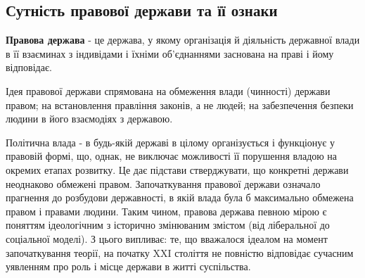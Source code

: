 \subsection{Сутність правової держави та її ознаки}
\textbf{Правова держава} - це держава, у якому організація й діяльність державної влади в її взаєминах з індивідами і їхніми об'єднаннями заснована на праві і йому відповідає.

Ідея правової держави спрямована на обмеження влади (чинності) держави правом; на встановлення правління законів, а не людей; на забезпечення безпеки людини в його взаємодіях з державою.

Політична влада - в будь-якій державі в цілому організується і функціонує у правовій формі, що, однак, не виключає можливості її порушення владою на окремих етапах розвитку. Це дає підстави стверджувати, що конкретні держави неоднаково обмежені правом. Започаткування правової держави означало прагнення до розбудови державності, в якій влада була б максимально обмежена правом і правами людини. Таким чином, правова держава певною мірою є поняттям ідеологічним з історично змінюваним змістом (від ліберальної до соціальної моделі). З цього випливає: те, що вважалося ідеалом на момент започаткування теорії, на початку XXI століття не повністю відповідає сучасним уявленням про роль і місце держави в житті суспільства.
